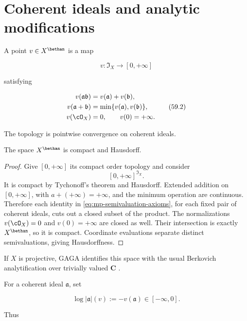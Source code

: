 \section{Coherent ideals and analytic modifications}
\label{sec:mp-dual-ideals}

A point $v\in X^{\bethan}$ is a map

\[
 v:\mathfrak I_X\longrightarrow[0,+\infty]
\tag{59.1}\label{eq:mp-semivaluation-ideals}
\]

satisfying

\[
 \begin{split}
 v(\mathfrak a\mathfrak b)&=v(\mathfrak a)+v(\mathfrak b),\\
 v(\mathfrak a+\mathfrak b)&=
             \min\{v(\mathfrak a),v(\mathfrak b)\},\\
 v(\cO_X)&=0,\qquad v(0)=+\infty.
 \end{split}
\tag{59.2}\label{eq:mp-semivaluation-axioms}
\]

The topology is pointwise convergence on coherent ideals.

\begin{proposition}\label{prop:mp-tropical-compactness}
The space $X^{\bethan}$ is compact and Hausdorff.
\end{proposition}

\begin{proof}
Give $[0,+\infty]$ its compact order topology and consider
\[
                    [0,+\infty]^{\mathfrak I_X}.
\]
It is compact by Tychonoff's theorem and Hausdorff.  Extended addition on
$[0,+\infty]$, with $a+(+\infty)=+\infty$, and the minimum operation
are continuous.  Therefore each identity in
\eqref{eq:mp-semivaluation-axioms}, for each fixed pair of coherent ideals,
cuts out a closed subset of the product.  The normalizations
$v(\cO_X)=0$ and $v(0)=+\infty$ are closed as well.  Their intersection
is exactly $X^{\bethan}$, so it is compact.  Coordinate evaluations
separate distinct semivaluations, giving Hausdorffness.
\end{proof}

If $X$ is projective, GAGA identifies this space with the usual Berkovich
analytification over trivially valued $\mathbf C$
\cite[Remark~1.3.3]{MPTropicalV2}.

For a coherent ideal $\mathfrak a$, set

\[
              \log|\mathfrak a|(v):=-v(\mathfrak a)
              \in[-\infty,0].
\tag{59.3}\label{eq:mp-log-ideal}
\]

Thus

